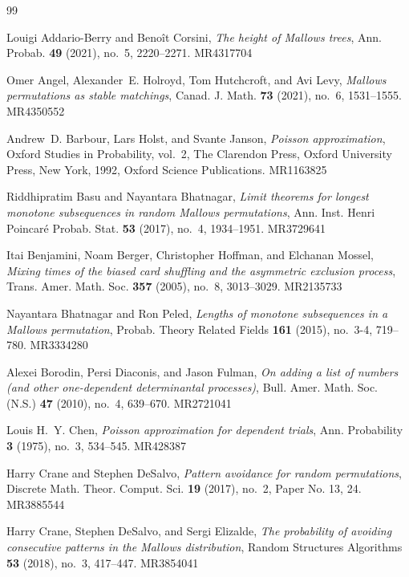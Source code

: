 \documentclass[letterpaper,11pt]{article}
\theoremstyle{definition}
\theoremstyle{remark}
\begin{document}
\begin{thebibliography}{99}
	
	Louigi Addario-Berry and Beno\^{i}t Corsini, \emph{The height of {M}allows
		trees}, Ann. Probab. \textbf{49} (2021), no.~5, 2220--2271. MR{4317704}
	
	Omer Angel, Alexander~E. Holroyd, Tom Hutchcroft, and Avi Levy, \emph{Mallows
		permutations as stable matchings}, Canad. J. Math. \textbf{73} (2021), no.~6,
	1531--1555. MR{4350552}
	
	Andrew~D. Barbour, Lars Holst, and Svante Janson, \emph{Poisson approximation},
	Oxford Studies in Probability, vol.~2, The Clarendon Press, Oxford University
	Press, New York, 1992, Oxford Science Publications. MR{1163825}
	
	Riddhipratim Basu and Nayantara Bhatnagar, \emph{Limit theorems for longest
		monotone subsequences in random {M}allows permutations}, Ann. Inst. Henri
	Poincar\'{e} Probab. Stat. \textbf{53} (2017), no.~4, 1934--1951.
	MR{3729641}
	
	Itai Benjamini, Noam Berger, Christopher Hoffman, and Elchanan Mossel,
	\emph{Mixing times of the biased card shuffling and the asymmetric exclusion
		process}, Trans. Amer. Math. Soc. \textbf{357} (2005), no.~8, 3013--3029.
	MR{2135733}
	
	Nayantara Bhatnagar and Ron Peled, \emph{Lengths of monotone subsequences in a
		{M}allows permutation}, Probab. Theory Related Fields \textbf{161} (2015),
	no.~3-4, 719--780. MR{3334280}
	
	Alexei Borodin, Persi Diaconis, and Jason Fulman, \emph{On adding a list of
		numbers (and other one-dependent determinantal processes)}, Bull. Amer. Math.
	Soc. (N.S.) \textbf{47} (2010), no.~4, 639--670. MR{2721041}
	
	Louis H.~Y. Chen, \emph{Poisson approximation for dependent trials}, Ann.
	Probability \textbf{3} (1975), no.~3, 534--545. MR{428387}
	
	Harry Crane and Stephen DeSalvo, \emph{Pattern avoidance for random
		permutations}, Discrete Math. Theor. Comput. Sci. \textbf{19} (2017), no.~2,
	Paper No. 13, 24. MR{3885544}
	
	Harry Crane, Stephen DeSalvo, and Sergi Elizalde, \emph{The probability of
		avoiding consecutive patterns in the {M}allows distribution}, Random
	Structures Algorithms \textbf{53} (2018), no.~3, 417--447. MR{3854041}
	

\end{thebibliography}
\end{document}
